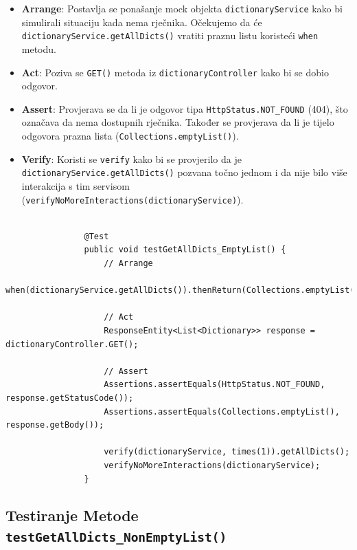 			\begin{itemize}
				\item \textbf{Arrange}: Postavlja se ponašanje mock objekta \texttt{dictionaryService} kako bi simulirali situaciju kada nema rječnika. Očekujemo da će \texttt{dictionaryService.getAllDicts()} vratiti praznu listu koristeći \texttt{when} metodu.
				
				\item \textbf{Act}: Poziva se \texttt{GET()} metoda iz \texttt{dictionaryController} kako bi se dobio odgovor.
				
				\item \textbf{Assert}: Provjerava se da li je odgovor tipa \texttt{HttpStatus.NOT\_FOUND} (404), što označava da nema dostupnih rječnika. Također se provjerava da li je tijelo odgovora prazna lista (\texttt{Collections.emptyList()}).
				
				\item \textbf{Verify}: Koristi se \texttt{verify} kako bi se provjerilo da je \texttt{dictionaryService.getAllDicts()} pozvana točno jednom i da nije bilo više interakcija s tim servisom (\texttt{verifyNoMoreInteractions(dictionaryService)}).
			\end{itemize}

			\begin{lstlisting}

				@Test
				public void testGetAllDicts_EmptyList() {
					// Arrange
					when(dictionaryService.getAllDicts()).thenReturn(Collections.emptyList());
			
					// Act
					ResponseEntity<List<Dictionary>> response = dictionaryController.GET();
			
					// Assert
					Assertions.assertEquals(HttpStatus.NOT_FOUND, response.getStatusCode());
					Assertions.assertEquals(Collections.emptyList(), response.getBody());
			
					verify(dictionaryService, times(1)).getAllDicts();
					verifyNoMoreInteractions(dictionaryService);
				}

			\end{lstlisting}
			
			\subsection{Testiranje Metode \texttt{testGetAllDicts_NonEmptyList()}}	

